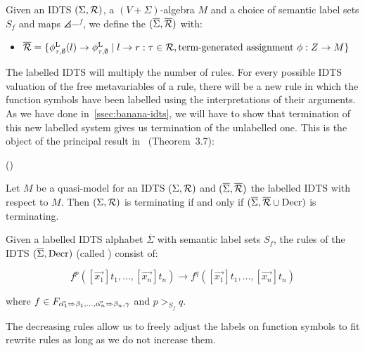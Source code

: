 \begin{definition}
  Given an IDTS $(\Sigma, \mathcal{R})$, a $(V+\Sigma)$-algebra $M$ and a choice of
  semantic label sets $S_f$ and maps $\angles{-}^f$, we define the
   $(\overline{\Sigma}, \overline{\mathcal{R}})$
  with:

  \begin{itemize}
  \item
    $\overline{\mathcal{R}} = \{ \phi^{\mathrm{L}}_{\tau,\emptyset}(l) \to
    \phi^{\mathrm{L}}_{\tau,\emptyset}\mid l \to r : \tau \in \mathcal{R},
    \text{term-generated assignment } \phi : Z \to M \}$
  \end{itemize}
\end{definition}

The labelled IDTS will multiply the number of rules. For every possible
IDTS valuation of the free metavariables of a rule, there will be a new
rule in which the function symbols have been labelled using the
interpretations of their arguments. As we have done
in~\ref{ssec:banana-idts}, we will have to show that termination of this
new labelled system gives us termination of the unlabelled one. This is the
object of the principal result in~\cite{hamana2007higher} (Theorem~3.7):

\begin{theorem}\label{thm:semantic-labelling}
  ()

  Let $M$ be a quasi-model for an IDTS $(\Sigma, \mathcal{R})$ and
  $(\overline{\Sigma}, \overline{\mathcal{R}})$ the labelled IDTS with respect to
  $M$. Then $(\Sigma, \mathcal{R})$ is terminating if and only if
  $(\overline{\Sigma}, \overline{\mathcal{R}} \cup \mathrm{Decr})$ is terminating.
\end{theorem}

\begin{definition}
  Given a labelled IDTS alphabet $\overline{\Sigma}$ with semantic label
  sets $S_f$, the rules of the IDTS $(\overline{\Sigma}, \mathrm{Decr})$ (called
  ) consist of:

  $$
  f^p([\vec{x_1}] t_1, \ldots, [\vec{x_n}] t_n) \longrightarrow f^q([\vec{x_1}] t_1, \ldots, [\vec{x_n}] t_n)
  $$

  where
  $f \in F_{\vec{\alpha_1} \Rightarrow \beta_1, \ldots, \vec{\alpha_n} \Rightarrow \beta_n,
    \gamma}$ and $p >_{S_f} q$.
\end{definition}

The decreasing rules allow us to freely adjust the labels on function
symbols to fit rewrite rules as long as we do not increase them.


